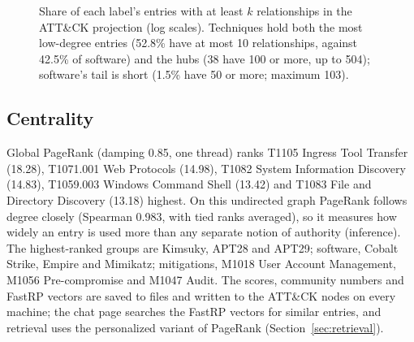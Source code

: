 \documentclass[conference,letterpaper]{IEEEtran}
\begin{document}
\begin{figure}[t]\centering
{}
\caption{Share of each label's entries with at least $k$ relationships in the ATT\&CK projection (log scales). Techniques hold both the most low-degree entries (52.8\% have at most 10 relationships, against 42.5\% of software) and the hubs (38 have 100 or more, up to 504); software's tail is short (1.5\% have 50 or more; maximum 103).}\label{fig:degree}
\end{figure}

\subsection{Centrality}
Global PageRank (damping 0.85, one thread) ranks T1105 Ingress Tool Transfer (18.28), T1071.001 Web Protocols (14.98), T1082 System Information Discovery (14.83), T1059.003 Windows Command Shell (13.42) and T1083 File and Directory Discovery (13.18) highest. On this undirected graph PageRank follows degree closely (Spearman 0.983, with tied ranks averaged), so it measures how widely an entry is used more than any separate notion of authority (inference). The highest-ranked groups are Kimsuky, APT28 and APT29; software, Cobalt Strike, Empire and Mimikatz; mitigations, M1018 User Account Management, M1056 Pre-compromise and M1047 Audit. The scores, community numbers and FastRP vectors are saved to files and written to the ATT\&CK nodes on every machine; the chat page searches the FastRP vectors for similar entries, and retrieval uses the personalized variant of PageRank (Section~\ref{sec:retrieval}).
\end{document}
